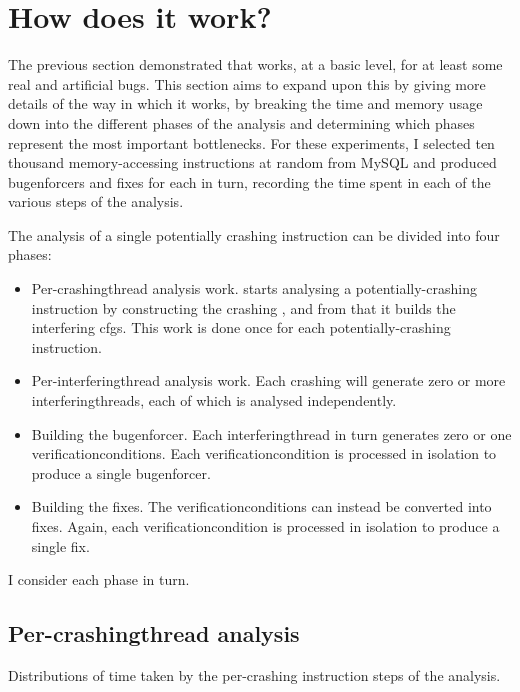 \section{How does it work?}
\label{sect:eval:how_does_it_work}

The previous section demonstrated that {\technique} works, at a basic
level, for at least some real and artificial bugs.  This section aims
to expand upon this by giving more details of the way in which it
works, by breaking the time and memory usage down into the different
phases of the analysis and determining which phases represent the most
important bottlenecks.  For these experiments, I selected ten thousand
memory-accessing instructions at random from MySQL and produced
\glspl{bugenforcer} and fixes for each in turn, recording the time
spent in each of the various steps of the analysis.

The analysis of a single potentially crashing instruction can be
divided into four phases:
\begin{itemize}
\item Per-\gls{crashingthread} analysis work.  {\Technique} starts
  analysing a potentially-crashing instruction by constructing the
  crashing {\StateMachine}, and from that it builds the interfering
  \glspl{cfg}.  This work is done once for each potentially-crashing
  instruction.
\item Per-\gls{interferingthread} analysis work.  Each crashing
  {\StateMachine} will generate zero or more
  \glspl{interferingthread}, each of which is analysed independently.
\item Building the \gls{bugenforcer}.  Each \gls{interferingthread} in
  turn generates zero or one \glspl{verificationcondition}.  Each
  \gls{verificationcondition} is processed in isolation to produce a
  single \gls{bugenforcer}.
\item Building the fixes.  The \glspl{verificationcondition} can
  instead be converted into fixes.  Again, each
  \gls{verificationcondition} is processed in isolation to produce a
  single fix.
\end{itemize}
I consider each phase in turn.

\subsection{Per-\gls{crashingthread} analysis}

\begin{sanefig}
  \caption{Distributions of time taken by the per-crashing instruction
    steps of the analysis.}
  \label{fig:eval:how:per_crashing_times}
\end{sanefig}

